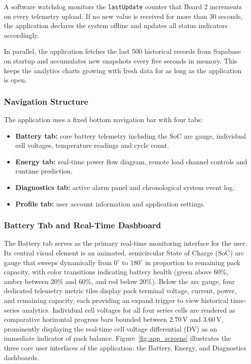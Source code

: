\documentclass[12pt, a4paper]{report}
\begin{document}
{A software watchdog monitors the \texttt{lastUpdate} counter that Board 2
increments on every telemetry upload. If no new value is received for more
than 30 seconds, the application declares the system offline and updates all
status indicators accordingly.

In parallel, the application fetches the last 500 historical records from
Supabase on startup and accumulates new snapshots every five seconds in memory.
This keeps the analytics charts growing with fresh data for as long as the
application is open.

\subsubsection{Navigation Structure}

The application uses a fixed bottom navigation bar with four tabs:

\begin{itemize}[noitemsep, leftmargin=0.7in]
  \item \textbf{Battery tab:} core battery telemetry including the SoC arc
        gauge, individual cell voltages, temperature readings and cycle count.
  \item \textbf{Energy tab:} real-time power flow diagram, remote load channel
        controls and runtime prediction.
  \item \textbf{Diagnostics tab:} active alarm panel and chronological system
        event log.
  \item \textbf{Profile tab:} user account information and application settings.
\end{itemize}

\subsubsection{Battery Tab and Real-Time Dashboard}

The Battery tab serves as the primary real-time monitoring interface for the user. Its central visual element is an animated, semicircular State of Charge (SoC) arc gauge that sweeps dynamically from $0^{\circ}$ to $180^{\circ}$ in proportion to remaining pack capacity, with color transitions indicating battery health (green above $60\%$, amber between $20\%$ and $60\%$, and red below $20\%$). Below the arc gauge, four dedicated telemetry metric tiles display pack terminal voltage, current, power, and remaining capacity, each providing an expand trigger to view historical time-series analytics. Individual cell voltages for all four series cells are rendered as comparative horizontal progress bars bounded between $2.70\,\text{V}$ and $3.60\,\text{V}$, prominently displaying the real-time cell voltage differential ($\text{DV}$) as an immediate indicator of pack balance. Figure~\ref{fig:app_screens} illustrates the three core user interfaces of the application: the Battery, Energy, and Diagnostics dashboards.

}
\end{document}
